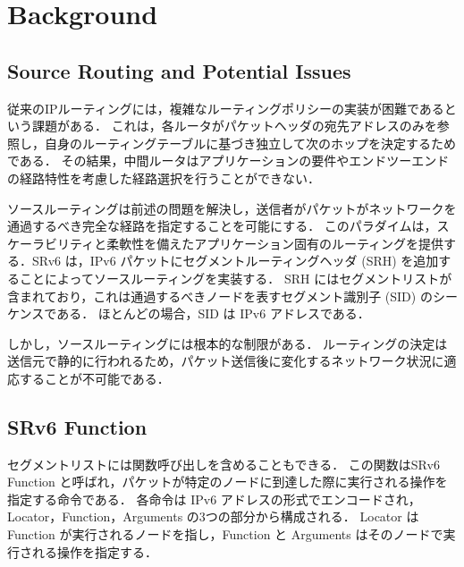 \documentclass[conference]{IEEEtran}
\begin{document}
\section{Background}

\subsection{Source Routing and Potential Issues}

従来のIPルーティングには，複雑なルーティングポリシーの実装が困難であるという課題がある．
これは，各ルータがパケットヘッダの宛先アドレスのみを参照し，自身のルーティングテーブルに基づき独立して次のホップを決定するためである．
その結果，中間ルータはアプリケーションの要件やエンドツーエンドの経路特性を考慮した経路選択を行うことができない．

ソースルーティングは前述の問題を解決し，送信者がパケットがネットワークを通過するべき完全な経路を指定することを可能にする．
このパラダイムは，スケーラビリティと柔軟性を備えたアプリケーション固有のルーティングを提供する．SRv6 は，IPv6 パケットにセグメントルーティングヘッダ (SRH) を追加することによってソースルーティングを実装する\cite{rfc8754}\cite{rfc9256}．
SRH にはセグメントリストが含まれており，これは通過するべきノードを表すセグメント識別子 (SID) のシーケンスである．
ほとんどの場合，SID は IPv6 アドレスである．

しかし，ソースルーティングには根本的な制限がある．
ルーティングの決定は送信元で静的に行われるため，パケット送信後に変化するネットワーク状況に適応することが不可能である．

\subsection{SRv6 Function}

セグメントリストには関数呼び出しを含めることもできる．
この関数はSRv6 Function と呼ばれ，パケットが特定のノードに到達した際に実行される操作を指定する命令である．
各命令は IPv6 アドレスの形式でエンコードされ，Locator，Function，Arguments の3つの部分から構成される．
Locator は Function が実行されるノードを指し，Function と Arguments はそのノードで実行される操作を指定する．


\end{document}
